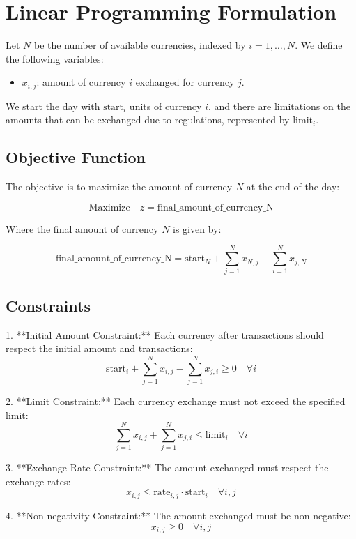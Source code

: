 \documentclass{article}
\begin{document}
\section*{Linear Programming Formulation}

Let \( N \) be the number of available currencies, indexed by \( i = 1, \ldots, N \). We define the following variables:

\begin{itemize}
    \item \( x_{i,j} \): amount of currency \( i \) exchanged for currency \( j \).
\end{itemize}

We start the day with \( \text{start}_i \) units of currency \( i \), and there are limitations on the amounts that can be exchanged due to regulations, represented by \( \text{limit}_i \).

\subsection*{Objective Function}

The objective is to maximize the amount of currency \( N \) at the end of the day:

\[
\text{Maximize} \quad z = \text{final\_amount\_of\_currency\_N}
\]

Where the final amount of currency \( N \) is given by:

\[
\text{final\_amount\_of\_currency\_N} = \text{start}_N + \sum_{j=1}^{N} x_{N,j} - \sum_{i=1}^{N} x_{j,N}
\]

\subsection*{Constraints}

1. **Initial Amount Constraint:**
   Each currency after transactions should respect the initial amount and transactions:
   \[
   \text{start}_i + \sum_{j=1}^{N} x_{i,j} - \sum_{j=1}^{N} x_{j,i} \geq 0 \quad \forall i
   \]

2. **Limit Constraint:**
   Each currency exchange must not exceed the specified limit:
   \[
   \sum_{j=1}^{N} x_{i,j} + \sum_{j=1}^{N} x_{j,i} \leq \text{limit}_i \quad \forall i
   \]

3. **Exchange Rate Constraint:**
   The amount exchanged must respect the exchange rates:
   \[
   x_{i,j} \leq \text{rate}_{i,j} \cdot \text{start}_i \quad \forall i,j
   \]

4. **Non-negativity Constraint:**
   The amount exchanged must be non-negative:
   \[
   x_{i,j} \geq 0 \quad \forall i,j
   \]
\end{document}
